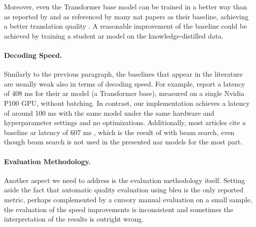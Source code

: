 Moreover, even the Transformer base model can be trained in a better way than
as reported by \citet{vaswani2017attention} and as referenced by many \ac{nat}
papers as their baseline, achieving a better translation quality
\citep{popel-bojar-2018-training}. A reasonable improvement of the baseline
could be achieved by training a student \ac{ar} model on the
knowledge-distilled data.

\paragraph{Decoding Speed.} Similarly to the previous paragraph, the baselines
that appear in the literature are usually weak also in terms of decoding speed.
For example, \citet{gu2017nonautoregressive} report a latency of 408 ms for
their \ac{ar} model (a Transformer base), measured on a single Nvidia P100 GPU,
without batching. In contrast, our implementation achieves a latency of around
100 ms with the same model under the same hardware and hyperparameter settings
and no optimizations. Additionally, most articles cite a baseline \ac{ar}
latency of 607 ms , which is the result of
\citet{gu2017nonautoregressive} with beam search, even though beam search is
not used in the presented \ac{nar} models for the most part.




\paragraph{Evaluation Methodology.} Another aspect we need to address is the
evaluation methodology itself. Setting aside the fact that automatic quality
evaluation using \acs{bleu} is the only reported metric, perhaps complemented
by a cursory manual evaluation on a small sample, the evaluation of the speed
improvements is inconsistent and sometimes the interpretation of the results is
outright wrong.

